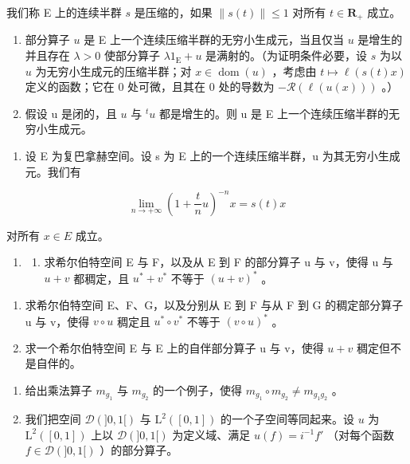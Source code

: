 我们称 E 上的连续半群 \(s\) 是压缩的，如果 \(\|s(t)\|\leqslant1\) 对所有 \(t\in\mathbf{R}_{+}\) 成立。

\begin{enumerate}
\def\labelenumi{\alph{enumi})}
\item
  部分算子 \(u\) 是 E 上一个连续压缩半群的无穷小生成元，当且仅当 \(u\) 是增生的并且存在 \(\lambda > 0\) 使部分算子 \(\lambda 1_{\mathrm{E}} + u\) 是满射的。（为证明条件必要，设 \(s\) 为以 \(u\) 为无穷小生成元的压缩半群；对 \(x \in \operatorname{dom}(u)\) ，考虑由 \(t \mapsto \ell(s(t)x)\) 定义的函数；它在 0 处可微，且其在 0 处的导数为 \(-\mathcal{R}(\ell(u(x)))\) 。）
\item
  假设 u 是闭的，且 \(u\) 与 \(^{t}u\) 都是增生的。则 u 是 E 上一个连续压缩半群的无穷小生成元。
\end{enumerate}

\begin{enumerate}
\def\labelenumi{\arabic{enumi})}
\setcounter{enumi}{7}
\tightlist
\item
  设 E 为复巴拿赫空间。设 s 为 E 上的一个连续压缩半群，u 为其无穷小生成元。我们有
\end{enumerate}

\[
\lim _ {n \to + \infty} \left(1 + \frac {t}{n} u\right) ^ {- n} x = s (t) x
\]

对所有 \(x \in E\) 成立。

\begin{enumerate}
\def\labelenumi{\arabic{enumi})}
\setcounter{enumi}{8}
\tightlist
\item
  \begin{enumerate}
  \def\labelenumii{\alph{enumii})}
  \tightlist
  \item
    求希尔伯特空间 E 与 F，以及从 E 到 F 的部分算子 u 与 v，使得 u 与 \(u + v\) 都稠定，且 \(u^{*} + v^{*}\) 不等于 \((u + v)^{*}\) 。
  \end{enumerate}
\end{enumerate}

\begin{enumerate}
\def\labelenumi{\alph{enumi})}
\setcounter{enumi}{1}
\item
  求希尔伯特空间 E、F、G，以及分别从 E 到 F 与从 F 到 G 的稠定部分算子 u 与 v，使得 \(v \circ u\) 稠定且 \(u^{*} \circ v^{*}\) 不等于 \((v \circ u)^{*}\) 。
\item
  求一个希尔伯特空间 E 与 E 上的自伴部分算子 u 与 v，使得 \(u + v\) 稠定但不是自伴的。
\end{enumerate}

\begin{enumerate}
\def\labelenumi{\arabic{enumi})}
\setcounter{enumi}{9}
\item
  给出乘法算子 \(m_{g_{1}}\) 与 \(m_{g_{2}}\) 的一个例子，使得 \(m_{g_{1}} \circ m_{g_{2}} \neq m_{g_{1}g_{2}}\) 。
\item
  我们把空间 \(\mathcal{D}(]0,1[)\) 与 \(\mathrm{L}^2 ([0,1])\) 的一个子空间等同起来。设 \(u\) 为 \(\mathrm{L}^2 ([0,1])\) 上以 \(\mathcal{D}(]0,1[)\) 为定义域、满足 \(u(f) = i^{-1}f'\) （对每个函数 \(f \in \mathcal{D}(]0,1[)\) ）的部分算子。
\end{enumerate}

